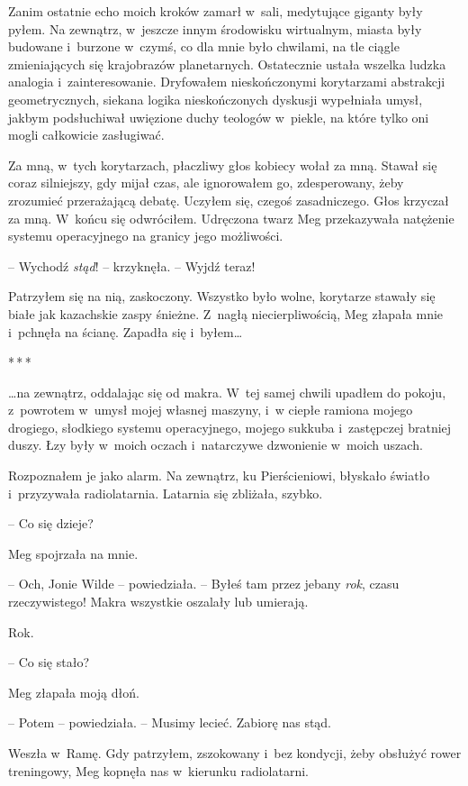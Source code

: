\documentclass[oneside,polish,11pt,sfheadings]{mwbk}
\newcommand{\threeast}{\bigskip\par\centerline{*\,*\,*}\medskip\par}
\begin{document}
Zanim ostatnie echo moich kroków zamarł w~sali, medytujące giganty były
pyłem. Na zewnątrz, w~jeszcze innym środowisku wirtualnym, miasta były
budowane i~burzone w~czymś, co dla mnie było chwilami, na tle ciągle
zmieniających się krajobrazów planetarnych. Ostatecznie ustała wszelka
ludzka analogia i~zainteresowanie. Dryfowałem nieskończonymi korytarzami
abstrakcji geometrycznych, siekana logika nieskończonych dyskusji
wypełniała umysł, jakbym podsłuchiwał uwięzione duchy teologów w~piekle,
na które tylko oni mogli całkowicie zasługiwać.

Za mną, w~tych korytarzach, płaczliwy głos kobiecy wołał za mną. Stawał
się coraz silniejszy, gdy mijał czas, ale ignorowałem go, zdesperowany,
żeby zrozumieć przerażającą debatę. Uczyłem się, czegoś zasadniczego.
Głos krzyczał za mną. W~końcu się odwróciłem. Udręczona twarz Meg
przekazywała natężenie systemu operacyjnego na granicy jego możliwości.

-- Wychodź \emph{stąd}! -- krzyknęła. -- Wyjdź teraz!

Patrzyłem się na nią, zaskoczony. Wszystko było wolne, korytarze stawały
się białe jak kazachskie zaspy śnieżne. Z~nagłą niecierpliwością, Meg
złapała mnie i~pchnęła na ścianę. Zapadła się i~byłem\ldots

\threeast

\ldots na zewnątrz, oddalając się od makra. W~tej samej chwili upadłem do
pokoju, z~powrotem w~umysł mojej własnej maszyny, i~w ciepłe ramiona
mojego drogiego, słodkiego systemu operacyjnego, mojego sukkuba i~zastępczej bratniej duszy. Łzy były w~moich oczach i~natarczywe
dzwonienie w~moich uszach.

Rozpoznałem je jako alarm. Na zewnątrz, ku Pierścieniowi, błyskało
światło i~przyzywała radiolatarnia. Latarnia się zbliżała, szybko.

-- Co się dzieje?

Meg spojrzała na mnie. 

-- Och, Jonie Wilde -- powiedziała. -- Byłeś tam
przez jebany \emph{rok}, czasu rzeczywistego! Makra wszystkie oszalały
lub umierają.

Rok. 

-- Co się stało?

Meg złapała moją dłoń. 

-- Potem -- powiedziała. -- Musimy lecieć. Zabiorę
nas stąd.

Weszła w~Ramę. Gdy patrzyłem, zszokowany i~bez kondycji, żeby obsłużyć
rower treningowy, Meg kopnęła nas w~kierunku radiolatarni.
\end{document}
